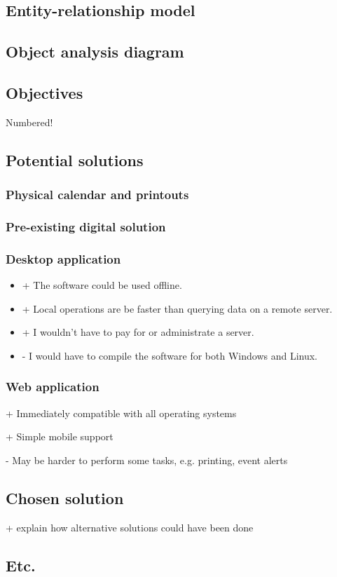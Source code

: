 \subsection{Entity-relationship model}
\lipsum
\subsection{Object analysis diagram}
\lipsum
\subsection{Objectives}

Numbered!


\subsection{Potential solutions}

\subsubsection{Physical calendar and printouts}
\subsubsection{Pre-existing digital solution}
\subsubsection{Desktop application}

\begin{itemize}
  \item + The software could be used offline.
  \item + Local operations are be faster than querying data on a remote server.
  \item + I wouldn't have to pay for or administrate a server.
  \item - I would have to compile the software for both Windows and Linux.
\end{itemize}


\subsubsection{Web application}

  \item + Immediately compatible with all operating systems
  \item + Simple mobile support
  \item - May be harder to perform some tasks, e.g. printing, event alerts


\subsection{Chosen solution}

+ explain how alternative solutions could have been done

\subsection{Etc.}
